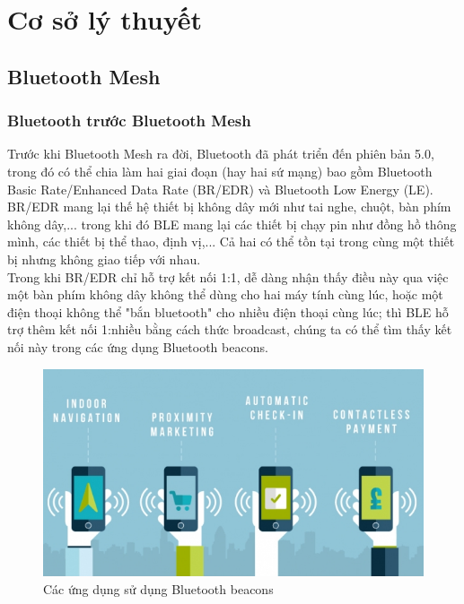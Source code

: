 \chapter{Cơ sở lý thuyết} \label{chap:theory}
    \section{Bluetooth Mesh}
    	\subsection{Bluetooth trước Bluetooth Mesh}
Trước khi Bluetooth Mesh ra đời, Bluetooth đã phát triển đến phiên bản 5.0, trong đó có thể chia làm hai giai đoạn (hay hai sứ mạng) bao gồm Bluetooth Basic Rate/Enhanced Data Rate (BR/EDR) và Bluetooth Low Energy (LE). BR/EDR mang lại thế hệ thiết bị không dây mới như tai nghe, chuột, bàn phím không dây,... trong khi đó BLE mang lại các thiết bị chạy pin như đồng hồ thông mình, các thiết bị thể thao, định vị,... Cả hai có thể tồn tại trong cùng một thiết bị nhưng không giao tiếp với nhau.\\

Trong khi BR/EDR chỉ hỗ trợ kết nối 1:1, dễ dàng nhận thấy điều này qua việc một bàn phím không dây không thể dùng cho hai máy tính cùng lúc, hoặc một điện thoại không thể "bắn bluetooth" cho nhiều điện thoại cùng lúc; thì BLE hỗ trợ thêm kết nối 1:nhiều bằng cách thức broadcast, chúng ta có thể tìm thấy kết nối này trong các ứng dụng Bluetooth beacons.
\newpage
       \begin{figure}[h!]
	        	\begin{center}
	        		\includegraphics[scale=0.8]{images/retail.png}
	        		\caption{Các ứng dụng sử dụng Bluetooth beacons}
	        	\end{center}
        \end{figure}
        

